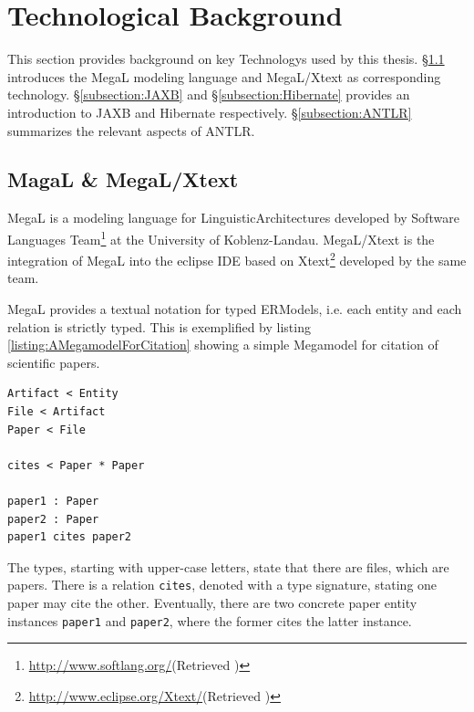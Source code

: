 \section{Technological Background}
This section provides background on key \glspl{Technology} used by this thesis.
§\ref{subsection:MegaLXText} introduces the \gls{MegaL} modeling language and \gls{MegaL/Xtext} as corresponding technology.
§\ref{subsection:JAXB} and §\ref{subsection:Hibernate} provides an introduction to \gls{JAXB} and \gls{Hibernate} respectively.
§\ref{subsection:ANTLR} summarizes the relevant aspects of \gls{ANTLR}.

\subsection{MagaL \& MegaL/Xtext}
\label{subsection:MegaLXText}
\gls{MegaL} \cite{DBLP:conf/ecmdafa/LammelV14} \cite{DBLP:conf/models/FavreLV12} is a modeling language for \glspl{LinguisticArchitecture} developed by Software Languages Team\footnote{\url{http://www.softlang.org/}(Retrieved )} at the University of Koblenz-Landau.
\gls{MegaL/Xtext} \cite{LukasHaertelBScThesis} \cite{HaertelHHLV17} is the integration of \gls{MegaL} into the eclipse \gls{IDE} based on Xtext\footnote{\url{http://www.eclipse.org/Xtext/}(Retrieved )} developed by the same team.

\Gls{MegaL} provides a textual notation for typed \glspl{ERModel}, i.e. each entity and each relation is strictly typed.
This is exemplified by listing \ref{listing:AMegamodelForCitation} showing a simple \gls{Megamodel} for citation of scientific papers.
\begin{lstlisting}[caption={A Megamodel for Citation},label={listing:AMegamodelForCitation}]
Artifact < Entity
File < Artifact
Paper < File

cites < Paper * Paper

paper1 : Paper
paper2 : Paper
paper1 cites paper2
\end{lstlisting}
The types, starting with upper-case letters, state that there are files, which are papers.
There is a relation \texttt{cites}, denoted with a type signature, stating one paper may cite the other.
Eventually, there are two concrete paper entity instances \texttt{paper1} and \texttt{paper2}, where the former cites the latter instance.

